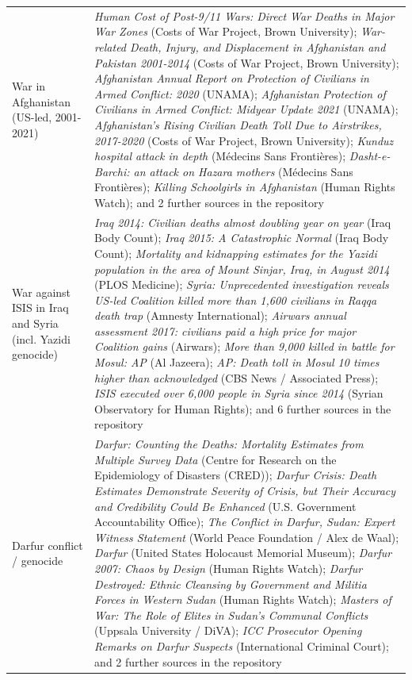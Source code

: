 \documentclass[11pt]{article}
\begin{document}
\begin{scriptsize}
\begin{longtable}{p{3.5cm} p{12.5cm}}
\addlinespace
War in Afghanistan (US-led, 2001-2021) & \emph{Human Cost of Post-9/11 Wars: Direct War Deaths in Major War Zones} (Costs of War Project, Brown University); \emph{War-related Death, Injury, and Displacement in Afghanistan and Pakistan 2001-2014} (Costs of War Project, Brown University); \emph{Afghanistan Annual Report on Protection of Civilians in Armed Conflict: 2020} (UNAMA); \emph{Afghanistan Protection of Civilians in Armed Conflict: Midyear Update 2021} (UNAMA); \emph{Afghanistan's Rising Civilian Death Toll Due to Airstrikes, 2017-2020} (Costs of War Project, Brown University); \emph{Kunduz hospital attack in depth} (Médecins Sans Frontières); \emph{Dasht-e-Barchi: an attack on Hazara mothers} (Médecins Sans Frontières); \emph{Killing Schoolgirls in Afghanistan} (Human Rights Watch); and 2 further sources in the repository \\
\addlinespace
War against ISIS in Iraq and Syria (incl. Yazidi genocide) & \emph{Iraq 2014: Civilian deaths almost doubling year on year} (Iraq Body Count); \emph{Iraq 2015: A Catastrophic Normal} (Iraq Body Count); \emph{Mortality and kidnapping estimates for the Yazidi population in the area of Mount Sinjar, Iraq, in August 2014} (PLOS Medicine); \emph{Syria: Unprecedented investigation reveals US-led Coalition killed more than 1,600 civilians in Raqqa death trap} (Amnesty International); \emph{Airwars annual assessment 2017: civilians paid a high price for major Coalition gains} (Airwars); \emph{More than 9,000 killed in battle for Mosul: AP} (Al Jazeera); \emph{AP: Death toll in Mosul 10 times higher than acknowledged} (CBS News / Associated Press); \emph{ISIS executed over 6,000 people in Syria since 2014} (Syrian Observatory for Human Rights); and 6 further sources in the repository \\
\addlinespace
Darfur conflict / genocide & \emph{Darfur: Counting the Deaths: Mortality Estimates from Multiple Survey Data} (Centre for Research on the Epidemiology of Disasters (CRED)); \emph{Darfur Crisis: Death Estimates Demonstrate Severity of Crisis, but Their Accuracy and Credibility Could Be Enhanced} (U.S. Government Accountability Office); \emph{The Conflict in Darfur, Sudan: Expert Witness Statement} (World Peace Foundation / Alex de Waal); \emph{Darfur} (United States Holocaust Memorial Museum); \emph{Darfur 2007: Chaos by Design} (Human Rights Watch); \emph{Darfur Destroyed: Ethnic Cleansing by Government and Militia Forces in Western Sudan} (Human Rights Watch); \emph{Masters of War: The Role of Elites in Sudan's Communal Conflicts} (Uppsala University / DiVA); \emph{ICC Prosecutor Opening Remarks on Darfur Suspects} (International Criminal Court); and 2 further sources in the repository \\

\end{longtable}
\end{scriptsize}
\end{document}
